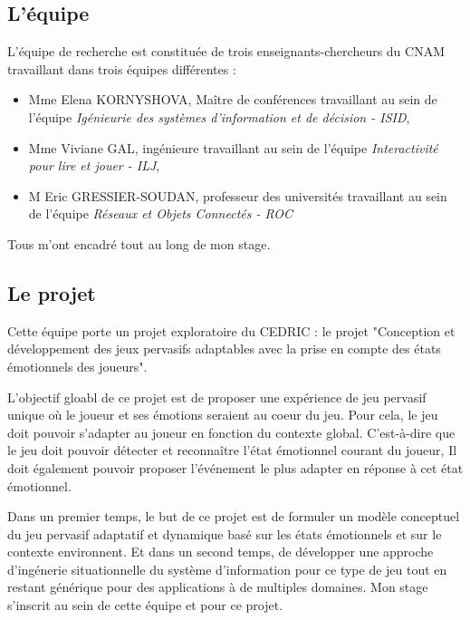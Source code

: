\documentclass{article}
\begin{document}
	\subsection{L'équipe}
		L'équipe de recherche est constituée de trois enseignants-chercheurs du CNAM travaillant dans trois équipes différentes :
		\begin{itemize}
			\item Mme Elena KORNYSHOVA, Maître de conférences travaillant au sein de l'équipe \textit{Igénieurie des systèmes d'information et de décision - ISID}, 
			\item Mme Viviane GAL, ingénieure travaillant au sein de l'équipe \textit{Interactivité pour lire et jouer - ILJ},
			\item M Eric GRESSIER-SOUDAN, professeur des universités travaillant au sein de l'équipe \textit{Réseaux et Objets Connectés - ROC}
		\end{itemize}
		Tous m'ont encadré tout au long de mon stage.
	\subsection{Le projet}
		Cette équipe porte un projet exploratoire du CEDRIC : le projet "Conception et développement des jeux pervasifs adaptables avec la prise en compte des états émotionnels des joueurs".\par
		L'objectif gloabl de ce projet est de proposer une expérience de jeu pervasif unique où le joueur et ses émotions seraient au coeur du jeu. 
		Pour cela, le jeu doit pouvoir s'adapter au joueur en fonction du contexte global. 
		C'est-à-dire que le jeu doit pouvoir détecter et reconnaître l'état émotionnel courant du joueur,
		Il doit également pouvoir proposer l'événement le plus adapter en réponse à cet état émotionnel.\par
		Dans un premier temps, le but de ce projet est de formuler un modèle conceptuel du jeu pervasif adaptatif et dynamique basé sur les états émotionnels et sur le contexte environnent. 
		Et dans un second temps, de développer une approche d'ingénerie situationnelle du système d'information pour ce type de jeu tout en restant générique pour des applications à de multiples domaines.\newline
		Mon stage s'inscrit au sein de cette équipe et pour ce projet.







\newpage
\appendix
\end{document}
